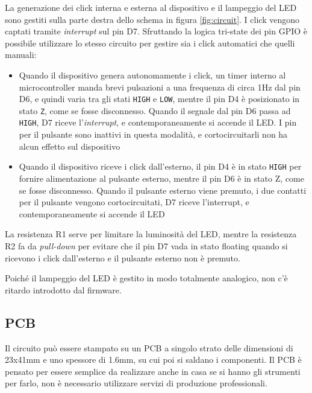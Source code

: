 La generazione dei click interna e esterna al dispositivo e il lampeggio del LED sono gestiti sulla parte destra dello schema in figura \ref{fig:circuit}. I click vengono captati tramite \textit{interrupt} sul pin D7. Sfruttando la logica tri-state dei pin GPIO è possibile utilizzare lo stesso circuito per gestire sia i click automatici che quelli manuali:
\begin{itemize}
	\item Quando il dispositivo genera autonomamente i click, un timer interno al microcontroller manda brevi pulsazioni a una frequenza di circa 1Hz dal pin D6, e quindi varia tra gli stati \texttt{HIGH} e \texttt{LOW}, mentre il pin D4 è posizionato in stato \texttt{Z}, come se fosse disconnesso. Quando il segnale dal pin D6 passa ad \texttt{HIGH}, D7 riceve l'\textit{interrupt}, e contemporaneamente si accende il LED. I pin per il pulsante sono inattivi in questa modalità, e cortocircuitarli non ha alcun effetto sul dispositivo
	\item Quando il dispositivo riceve i click dall'esterno, il pin D4 è in stato \texttt{HIGH} per fornire alimentazione al pulsante esterno, mentre il pin D6 è in stato Z, come se fosse disconnesso. Quando il pulsante esterno viene premuto, i due contatti per il pulsante vengono cortocircuitati, D7 riceve l'interrupt, e contemporaneamente si accende il LED
\end{itemize}

La resistenza R1 serve per limitare la luminosità del LED, mentre la resistenza R2 fa da \textit{pull-down} per evitare che il pin D7 vada in stato floating quando si ricevono i click dall'esterno e il pulsante esterno non è premuto.

Poiché il lampeggio del LED è gestito in modo totalmente analogico, non c'è ritardo introdotto dal firmware.

\subsection{PCB}
Il circuito può essere stampato su un PCB a singolo strato delle dimensioni di 23x41mm e uno spessore di 1.6mm, su cui poi si saldano i componenti. Il PCB è pensato per essere semplice da realizzare anche in casa se si hanno gli strumenti per farlo, non è necessario utilizzare servizi di produzione professionali.

